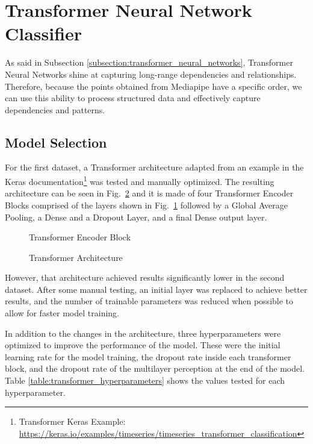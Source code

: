 \section{Transformer Neural Network Classifier}

As said in Subsection \ref{subsection:transformer_neural_networks}, Transformer Neural Networks shine at capturing long-range dependencies and relationships. Therefore, because the points obtained from Mediapipe have a specific order, we can use this ability to process structured data and effectively capture dependencies and patterns.

\subsection{Model Selection}

For the first dataset, a Transformer architecture adapted from an example in the Keras documentation\footnote{Transformer Keras Example: \url{https://keras.io/examples/timeseries/timeseries_transformer_classification}} was tested and manually optimized. The resulting architecture can be seen in Fig.~\ref{fig:transformer_architecture_dataset1} and it is made of four Transformer Encoder Blocks comprised of the layers shown in Fig.~\ref{fig:transformer_encoder_architecture} followed by a Global Average Pooling, a Dense and a Dropout Layer, and a final Dense output layer.

\begin{figure}[H]
    \centering
    {\fontsize{10}{12}\selectfont}
    \caption[Transformer Encoder Block]{Transformer Encoder Block}
    \label{fig:transformer_encoder_architecture}
\end{figure}

\begin{figure}[H]
    \centering
    {\fontsize{10}{12}\selectfont}
    \caption[Transformer Architecture]{Transformer Architecture}
    \label{fig:transformer_architecture_dataset1}
\end{figure}

However, that architecture achieved results significantly lower in the second dataset. After some manual testing, an initial layer was replaced to achieve better results, and the number of trainable parameters was reduced when possible to allow for faster model training.

In addition to the changes in the architecture, three hyperparameters were optimized to improve the performance of the model. These were the initial learning rate for the model training, the dropout rate inside each transformer block, and the dropout rate of the multilayer perception at the end of the model. Table \ref{table:transformer_hyperparameters} shows the values tested for each hyperparameter.

